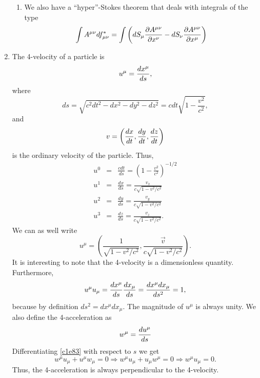 \begin{enumerate}
\begin{enumerate}
\item We also have a ``hyper''-Stokes theorem that deals with integrals of the 
type
\begin{equation}\label{c1e77}
\int A^{\mu\nu}df^\ast_{\mu\nu} = \int\left(dS_\mu\frac{\partial{A^{\mu\nu}}}{\partial{x^\nu}} - dS_\nu\frac{\partial{A^{\mu\nu}}}{\partial{x^\mu}}\right)
\end{equation}
\end{enumerate}

\item The 4-velocity of a particle is
\begin{equation}\label{c1e78}
u^\mu = \frac{d{x^\mu}}{d{s}},
\end{equation}
where
\[
ds = \sqrt{c^2dt^2 - dx^2 - dy^2 - dz^2} = cdt\sqrt{1 - \frac{v^2}{c^2}},
\]
and
\[
v = \left(\frac{d{x}}{d{t}}, \frac{d{y}}{d{t}}, \frac{d{z}}{d{t}}\right)
\]
is the ordinary velocity of the particle. Thus,
\begin{eqnarray}
u^0 &=& \frac{cdt}{ds} = \left(1 - \frac{v^2}{c^2}\right)^{-1/2} \label{c1e79} \\
u^1 &=& \frac{dx}{ds} = \frac{v_x}{c\sqrt{1 - v^2/c^2}} \label{c1e80} \\
u^2 &=& \frac{dy}{ds} = \frac{v_y}{c\sqrt{1 - v^2/c^2}} \label{c1e81} \\
u^3 &=& \frac{dz}{ds} = \frac{v_z}{c\sqrt{1 - v^2/c^2}}. \label{c1e82}
\end{eqnarray}
We can as well write
\begin{equation}\label{c1e83}
u^\mu = \left(\frac{1}{\sqrt{1 - v^2/c^2}}, \frac{\vec{v}}{c\sqrt{1 - v^2/c^2}}\right).
\end{equation}
It is interesting to note that the 4-velocity is a dimensionless quantity. Furthermore,
\begin{equation}\label{c1e84}
u^\mu u_\mu = \frac{d{x^\mu}}{d{s}}\frac{d{x_\mu}}{d{s}} = \frac{dx^\mu dx_\mu}{ds^2} = 1,
\end{equation}
because by definition $ds^2 = dx^\mu dx_\mu$. The magnitude of $u^\mu$ is always
unity. We also define the 4-acceleration as
\begin{equation}\label{c1e85}
w^\mu = \frac{d{u^\mu}}{d{s}}
\end{equation}
Differentiating \eqref{c1e83} with respect to $s$ we get
\begin{equation}\label{c1e86}
w^\mu u_\mu + u^\mu w_\mu = 0 \Rightarrow w^\mu u_\mu + u_\mu w^\mu = 0 \Rightarrow w^\mu u_\mu = 0.
\end{equation}
Thus, the 4-acceleration is always perpendicular to the 4-velocity.
\end{enumerate}

